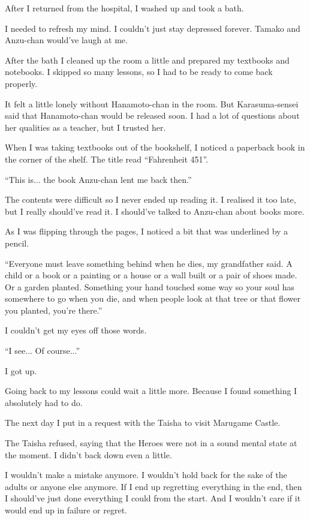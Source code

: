 After I returned from the hospital, I washed up and took a bath.

I needed to refresh my mind. I couldn't just stay depressed forever. Tamako and Anzu-chan would've laugh at me.

After the bath I cleaned up the room a little and prepared my textbooks and notebooks. I skipped so many lessons, so I had to be ready to come back properly.

It felt a little lonely without Hanamoto-chan in the room. But Karasuma-sensei said that Hanamoto-chan would be released soon. I had a lot of questions about her qualities as a teacher, but I trusted her.

When I was taking textbooks out of the bookshelf, I noticed a paperback book in the corner of the shelf. The title read ``Fahrenheit 451''.

``This is... the book Anzu-chan lent me back then.''

The contents were difficult so I never ended up reading it. I realised it too late, but I really should've read it. I should've talked to Anzu-chan about books more.

As I was flipping through the pages, I noticed a bit that was underlined by a pencil.

``Everyone must leave something behind when he dies, my grandfather said. A child or a book or a painting or a house or a wall built or a pair of shoes made. Or a garden planted. Something your hand touched some way so your soul has somewhere to go when you die, and when people look at that tree or that flower you planted, you’re there.''

I couldn't get my eyes off those words.

``I see... Of course...''

I got up.

Going back to my lessons could wait a little more. Because I found something I absolutely had to do.

The next day I put in a request with the Taisha to visit Marugame Castle.

The Taisha refused, saying that the Heroes were not in a sound mental state at the moment. I didn't back down even a little.

I wouldn't make a mistake anymore. I wouldn't hold back for the sake of the adults or anyone else anymore. If I end up regretting everything in the end, then I should've just done everything I could from the start. And I wouldn't care if it would end up in failure or regret.

